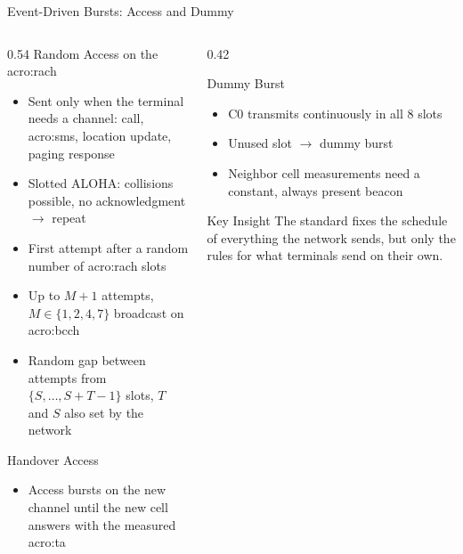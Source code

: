 \begin{frame}{Event-Driven Bursts: Access and Dummy}
  \begin{columns}[T,onlytextwidth]
    \begin{column}{0.54\textwidth}
      Random Access on the \acrshort{acro:rach}~\cite{etsi.144.018.v18}
      \begin{itemize}
        \item Sent only when the terminal needs a channel: call, \acrshort{acro:sms}, location update, paging response
        \item Slotted ALOHA: collisions possible, no acknowledgment $\rightarrow$ repeat
        \item First attempt after a random number of \acrshort{acro:rach} slots
        \item Up to $M+1$ attempts, $M \in \{1, 2, 4, 7\}$ broadcast on \acrshort{acro:bcch}
        \item Random gap between attempts from $\{S, \dots, S+T-1\}$ slots, $T$ and $S$ also set by the network
      \end{itemize}
      Handover Access
      \begin{itemize}
        \item Access bursts on the new channel until the new cell answers with the measured \acrshort{acro:ta}
      \end{itemize}
    \end{column}
    \begin{column}{0.42\textwidth}
      \begin{block}{Dummy Burst}
        \begin{itemize}
          \item C0 transmits continuously in all 8 slots
          \item Unused slot $\rightarrow$ dummy burst
          \item Neighbor cell measurements need a constant, always present beacon
        \end{itemize}
      \end{block}
      \begin{alertblock}{Key Insight}
        The standard fixes the schedule of everything the network sends, but only the rules for what terminals send on their own.
      \end{alertblock}
    \end{column}
  \end{columns}
\end{frame}

